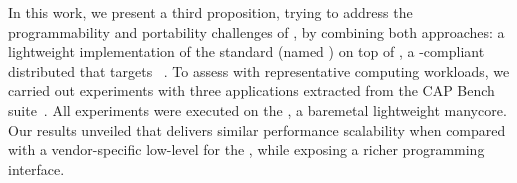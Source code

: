 	In this work, we present a third proposition, trying to address the programmability and
	portability challenges of \lws, by combining both approaches: a lightweight
	implementation of the \mpi standard (named \lwmpi) on top of \nanvix,
	a \posix-compliant distributed \os that targets \lws~\cite{Penna2019-3}.
	To assess \lwmpi with representative
	computing workloads, we carried out experiments with three applications extracted
	from the CAP Bench suite~\cite{Souza2017}. All experiments were executed on the
	\mppa, a baremetal lightweight manycore. Our results unveiled that \lwmpi delivers
	similar performance scalability when compared
	with a vendor-specific low-level \api for the \mppa, while exposing a richer
	programming interface.

